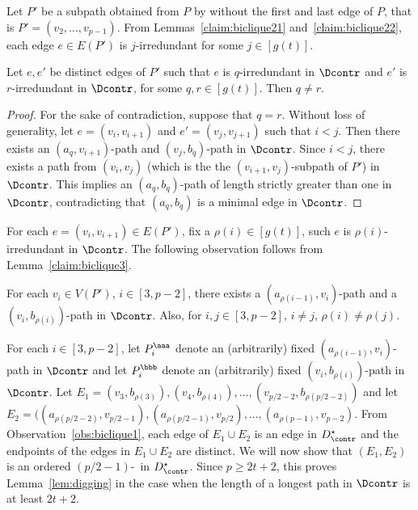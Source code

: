Let $P'$ be a subpath obtained from $P$ by without the first and last edge of $P$, that is $P'=(v_2, \ldots,v_{p-1})$. From Lemmas~\ref{claim:biclique21} and~\ref{claim:biclique22}, each edge $e \in E(P')$ is $j$-irredundant for some $j \in [g(t)]$.

\begin{lemma}\label{claim:biclique3}
Let $e,e'$ be distinct edges of $P'$ such that $e$ is $q$-irredundant in $\Dcontr$ and $e'$ is $r$-irredundant in $\Dcontr$, for some $q,r \in [g(t)]$. Then $q \neq r$.
\end{lemma}

\begin{proof}
For the sake of contradiction, suppose that $q=r$. Without loss of generality, let $e=(v_i,v_{i+1})$ and $e'=(v_j,v_{j+1})$ such that $i<j$. Then there exists an $(a_q,v_{i+1})$-path and $(v_j,b_q)$-path in $\Dcontr$. Since $i < j$, there exists a path from $(v_i,v_j)$ (which is the the $(v_{i+1},v_j)$-subpath of $P'$) in $\Dcontr$. This implies an $(a_q,b_q)$-path of length strictly greater than one in $\Dcontr$, contradicting that $(a_q,b_q)$ is a minimal edge in $\Dcontr$.
\end{proof}

For each $e=(v_i,v_{i+1}) \in E(P')$, fix a $\rho(i) \in [g(t)]$, such $e$ is $\rho(i)$-irredundant in $\Dcontr$. 
The following observation follows from Lemma~\ref{claim:biclique3}.

\begin{observation}\label{obs:biclique1}
For each $v_i \in V(P')$, $i \in [3, p-2]$, there exists a $(a_{\rho(i-1)},v_i)$-path and a $(v_i, b_{\rho(i)})$-path in $\Dcontr$.  Also, for $i,j \in [3,p-2]$, $i \neq j$, $\rho(i) \neq \rho(j)$.
\end{observation}

For each $i \in [3,p-2]$, let $P^{\aaa}_i$ denote an (arbitrarily) fixed $(a_{\rho(i-1)},v_i)$-path in $\Dcontr$ and let $P^{\bbb}_i$ denote an (arbitrarily) fixed $(v_i,b_{\rho(i)})$-path in $\Dcontr$.
Let $E_1 = (v_3, b_{\rho(3)}), \allowbreak  (v_4, b_{\rho(4)}), \ldots, \allowbreak (v_{p/2-2}, b_{\rho(p/2-2)})$ and let 
 $E_2 = ((a_{\rho(p/2-2)},v_{p/2-1}), \allowbreak  (a_{\rho(p/2-1)}, \allowbreak v_{p/2}), \ldots, (a_{\rho(p-1)}, \allowbreak v_{p-2})$. 
 From Observation~\ref{obs:biclique1}, each edge of $E_1 \cup E_2$ is an edge in $D^{\star}_{\contr}$ and the endpoints of the edges in $E_1 \cup E_2$ are distinct. We will now show that $(E_1,E_2)$ is an ordered $(p/2-1)$-\toughpair\ in $D^{\star}_{\contr}$. Since $p \geq 2t+2$, this proves Lemma~\ref{lem:digging} in the case when the length of a longest path in $\Dcontr$ is at least $2t+2$.
 
